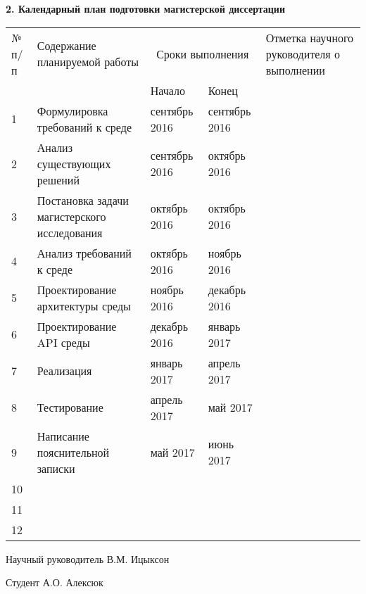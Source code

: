 \begin{center}

\textbf{2. Календарный план подготовки магистерской диссертации}

\vspace{1em}

\begin{tabularx}{\textwidth}{| p{0.5cm} | p{5.5cm} | X | X | p{3cm} |}
\hline
№ п/п & Содержание планируемой работы & \multicolumn{2}{|c|}{Сроки выполнения}
& Отметка \mbox{научного} \mbox{руководителя} о выполнении \\ \cline{3-4}
& & Начало & Конец & \\ \hline
1 & Формулировка требований к среде & сентябрь 2016 & сентябрь 2016 & \\ \hline
2 & Анализ существующих решений & сентябрь 2016 & октябрь 2016 & \\ \hline
3 & Постановка задачи магистерского исследования & октябрь 2016 & октябрь 2016 & \\ \hline
4 & Анализ требований к среде & октябрь 2016 & ноябрь 2016 & \\ \hline
5 & Проектирование архитектуры среды & ноябрь 2016 & декабрь 2016 & \\ \hline
6 & Проектирование API среды & декабрь 2016 & январь 2017 & \\ \hline
7 & Реализация & январь 2017 & апрель 2017 & \\ \hline
8 & Тестирование & апрель 2017 & май 2017 & \\ \hline
9 & Написание пояснительной записки & май 2017 & июнь 2017 & \\ \hline
10 & & & & \\ \hline
11 & & & & \\ \hline
12 & & & & \\ \hline
\end{tabularx}

\end{center}

\vspace{1em}

Научный руководитель \uline{\hfill} В.М. Ицыксон

\vspace{1em}

Студент \uline{\hfill} А.О. Алексюк
